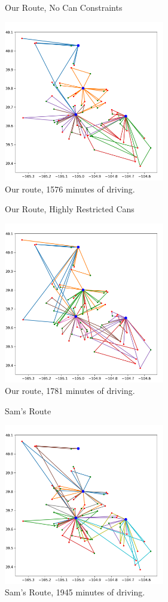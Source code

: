 \documentclass{beamer}
\begin{document}
\begin{frame}{Our Route, No Can Constraints}
	\begin{center}
	\includegraphics[width=7cm]{our_route.png}\\
	Our route, 1576 minutes of driving.
	\end{center}
\end{frame}

\begin{frame}{Our Route, Highly Restricted Cans}
	\begin{center}
	\includegraphics[width=7cm]{our_route_cans.png}\\
	Our route, 1781 minutes of driving.
	\end{center}
\end{frame}

\begin{frame}{Sam's Route}
	\begin{center}
	\includegraphics[width=7cm]{sams_route.png}\\
	Sam's Route, 1945 minutes of driving.
	\end{center}
\end{frame}
\end{document}
